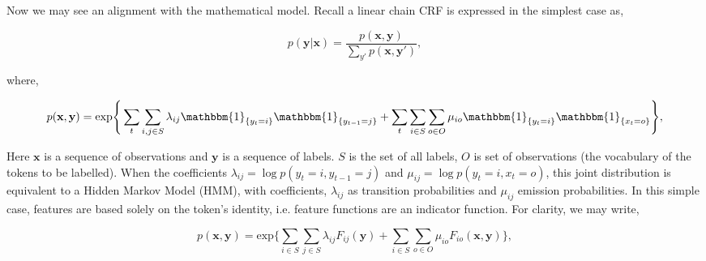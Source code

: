 \documentclass[10pt, oneside]{scrartcl}   	%
\begin{document}
Now we may see an alignment with the mathematical model. Recall a linear chain CRF is expressed in the simplest case as,

\begin{equation}
p(\textbf{y}|\textbf{x}) = \frac{p(\textbf{x}, \textbf{y})}{\sum_{y'}{p(\textbf{x}, \textbf{y}')}},
\end{equation}

where, 

\begin{equation}
p(\textbf{x}, \textbf{y}) = \text{exp} \Bigg\{\sum_t{
\sum_{i, j \in S}{
\lambda_{ij}\mathbbm{1}_{\{y_t = i\}}\mathbbm{1}_{\{y_{t-1} = j\}}
}
+ \sum_t\sum_{i \in S}\sum_{o \in O}{
\mu_{io}\mathbbm{1}_{\{y_t = i\}}\mathbbm{1}_{\{x_t = o\}}
}
}\Bigg\},
\label{eq:joint}
\end{equation}

Here $\textbf{x}$ is a sequence of observations and $\textbf{y}$ is a sequence of labels. $S$ is the set of all labels, $O$ is set of observations (the vocabulary of the tokens to be labelled). When the coefficients $\lambda_{ij} = \log p(y_t=i, y_{t - 1}=j)$ and $\mu_{ij} = \log p(y_t=i,x_t=o)$, this joint distribution is equivalent to a Hidden Markov Model (HMM), with coefficients, $\lambda_{ij}$ as transition probabilities and $\mu_{ij}$ emission probabilities. In this simple case, features are based solely on the token's identity, i.e. feature functions are an indicator function. For clarity, we may write,

\begin{equation}
p(\textbf{x}, \textbf{y}) = \text{exp} \Bigg\{
\sum_{i \in S}
\sum_{j \in S}
\lambda_{ij}
F_{ij}(\textbf{y})
+ 
\sum_{i \in S}
\sum_{o \in O}
\mu_{io}
F_{io}(\textbf{x}, \textbf{y})
\Bigg\},
\label{eq:joint}
\end{equation}
\end{document}

